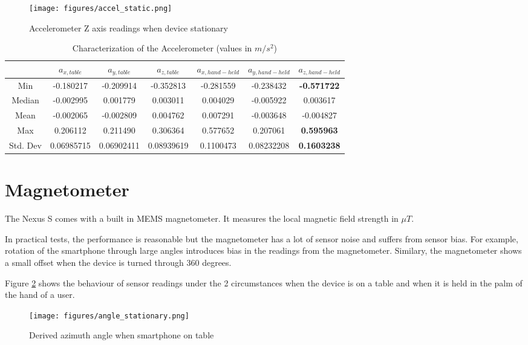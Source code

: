 \begin{figure}\centering
    \texttt{[image: figures/accel\_static.png]}
    \caption{Accelerometer Z axis readings when device stationary\label{fig:accel_static}}
\end{figure}

\begin{table}
\centering
\begin{tabular}{c c c c c c c}
\hline
\hline
 & $a_{x,table}$ & $a_{y,table}$ & $a_{z,table}$ & $a_{x,hand-held}$ & $a_{y,hand-held}$ & $a_{z,hand-held}$ \\
\hline
Min & -0.180217 & -0.209914 & -0.352813 & -0.281559 & -0.238432 & \textbf{-0.571722} \\
Median & -0.002995 & 0.001779 & 0.003011 & 0.004029 & -0.005922 & 0.003617 \\
Mean & -0.002065 & -0.002809 & 0.004762 & 0.007291 & -0.003648 & -0.004827 \\
Max & 0.206112 & 0.211490 & 0.306364 & 0.577652 & 0.207061 & \textbf{0.595963} \\
Std. Dev & 0.06985715 & 0.06902411 & 0.08939619 & 0.1100473 & 0.08232208 & \textbf{0.1603238} \\
\hline
\end{tabular}
\caption{Characterization of the Accelerometer (values in $m/s^2$)\label{tbl:accel_chars}}
\end{table}


\section{Magnetometer}

The Nexus S comes with a built in MEMS magnetometer.
It measures the local magnetic field strength in $\mu T$.

In practical tests, the performance is reasonable but the magnetometer has a 
lot of sensor noise and suffers from sensor bias. For example, rotation of 
the smartphone through large angles introduces bias in the readings from the 
magnetometer. Similary, the magnetometer shows a small offset when the device is 
turned through 360 degrees.

Figure \ref{fig:angle_stationary_table}
shows the behaviour of sensor readings under the 2 circumstances when the 
device is on a table and when it is held in the palm of the hand of a user.

\begin{figure}\centering
    \texttt{[image: figures/angle\_stationary.png]}
    \caption{Derived azimuth angle when smartphone on table\label{fig:angle_stationary_table}}
\end{figure}


